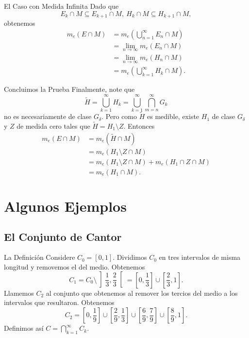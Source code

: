 \documentclass[utf8]{beamer}
\theoremstyle{plain}
\theoremstyle{definition}
\theoremstyle{remark}
\numberwithin{equation}{section}
\newcommand{\dl}{\delta}                %
\newcommand{\bonj}[1]{\left\lbrack#1\right\rbrack}
\newcommand{\obonj}[1]{\left\rbrack#1\right\lbrack}
\newcommand{\less}{\setminus}           %
\newcommand{\suck}{_{k=1}^\infty} %
\newcommand{\sucn}{_{n=1}^\infty} %
\renewcommand{\.}{\Cdot}                %
\begin{document}
\begin{frame}{El Caso con Medida Infinita}
  Dado que 
  $$E_k\cap M\subseteq E_{k+1}\cap M,\ H_k\cap M\subseteq H_{k+1}\cap M,$$
  obtenemos 
  \begin{align*}
    m_e(E\cap M)&=m_e\left(\bigcup\sucn E_n\cap M\right)\\
    &=\lim_{n\to\infty}m_e\left(E_n\cap M\right)\\
    &=\lim_{n\to\infty}m_e\left(H_n\cap M\right)\\
    &=m_e\left(\bigcup\suck H_k\cap M\right).
  \end{align*}
\end{frame}

\begin{frame}{Concluimos la Prueba}
  Finalmente, note que 
  $$\tilde{H}=\bigcup\suck H_k=\bigcup\suck\bigcap_{m=n}^\infty G_k$$
  no es necesariamente de clase $G_\dl$. Pero como $\tilde{H}$ es medible, existe $H_1$ de clase $G_\dl$ y $Z$ de medida cero tales que $\tilde{H}=H_1\less Z$. Entonces
  \begin{align*}
    m_e(E\cap M)&=m_e(\tilde{H}\cap M)\\
    &=m_e(H_1\less Z\cap M)\\
    &=m_e(H_1\less Z\cap M)+m_e(H_1\cap Z\cap M)\\
    &=m_e(H_1\cap M).
  \end{align*}
\end{frame}

\section{Algunos Ejemplos}

\subsection{El Conjunto de Cantor}

\begin{frame}{La Definición}\label{ComienzaConjCantor}
  Considere $C_0=\bonj{0,1}$. Dividimos $C_0$ en tres intervalos de misma longitud y removemos el del medio. Obtenemos 
  $$C_1=C_0\less\obonj{\frac{1}{3},\frac{2}{3}}=\bonj{0,\frac{1}{3}}\cup\bonj{\frac{2}{3},1}.$$
  Llamemos $C_2$ al conjunto que obtenemos al remover los tercios del medio a los intervalos que resultaron. Obtenemos 
  $$C_2=\bonj{0,\frac19}\cup\bonj{\frac29,\frac13}\cup\bonj{\frac69,\frac79}\cup\bonj{\frac89,1}.$$
  Definimos as\'i $C=\bigcap\suck C_k$.
\end{frame}
\end{document}
